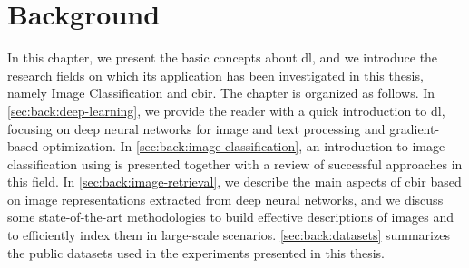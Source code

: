 
\graphicspath{{img/back/}}

\renewcommand{\x}{\mathbf{x}} %
\renewcommand{\X}{\mathbf{X}} %

\renewcommand{\y}{\mathbf{y}} %
\renewcommand{\Y}{\mathbf{Y}} %

\renewcommand{\w}{\mathbf{w}} %
\renewcommand{\W}{\mathbf{W}} %
\renewcommand{\b}{\mathbf{b}} %

\renewcommand{\z}{\mathbf{z}} %
\renewcommand{\h}{\mathbf{h}} %
\renewcommand{\o}{\mathbf{o}} %
\renewcommand{\p}{\mathbf{p}} %
\renewcommand{\m}{\mathbf{m}} %
\renewcommand{\v}{\mathbf{v}} %
\renewcommand{\q}{\mathbf{q}} %

\renewcommand{\i}{\mathbf{i}} %
\renewcommand{\f}{\mathbf{f}} %
\renewcommand{\u}{\mathbf{u}} %
\renewcommand{\c}{\mathbf{c}} %

\renewcommand{\R}{\mathbb{R}} %
\renewcommand{\L}{\mathcal{L}} %
\renewcommand{\a}{\varphi} %

\renewcommand{\Reg}{\mathcal{R}} %

\renewcommand{\(}{\left (} %
\renewcommand{\)}{\right )} %


\chapter{Background}
\label{ch:background}



In this chapter, we present the basic concepts about \gls{dl}, and we introduce the research fields on which its application has been investigated in this thesis, namely Image Classification and \gls{cbir}.
The chapter is organized as follows.
In \ref{sec:back:deep-learning}, we provide the reader with a quick introduction to \acrlong{dl}, focusing on deep neural networks for image and text processing and gradient-based optimization.
In \ref{sec:back:image-classification}, an introduction to image classification using  is presented together with a review of successful approaches in this field.
In \ref{sec:back:image-retrieval}, we describe the main aspects of \gls{cbir} based on image representations extracted from deep neural networks, and we discuss some state-of-the-art methodologies to build effective descriptions of images and to efficiently index them in large-scale scenarios.
\ref{sec:back:datasets} summarizes the public datasets used in the experiments presented in this thesis.


